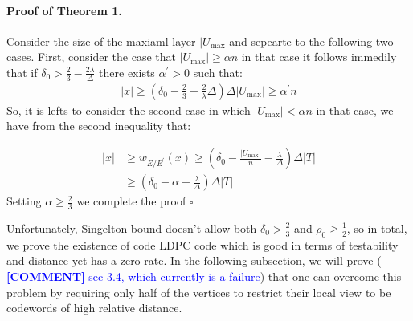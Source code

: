\documentclass{article}
\newcommand{\commentt}[1]{\textcolor{blue}{ \textbf{[COMMENT]} #1}}
\newcommand{\ctt}[1]{\commentt{#1}}
\begin{document}
\begin{multicols*}{2}
  \paragraph{Proof of Theorem 1.} Consider the size of the maxiaml layer $|U_{\max}$ and sepearte to the following two cases. First, consider the case that $|U_{\max}| \ge  \alpha n $ in that case it follows immedily that if $\delta_{0} > \frac{2}{3} - \frac{2\lambda}{\Delta}$ there exists $\alpha^{\prime} > 0 $ such that:  
  \begin{equation*}
    \begin{split}
      |x| \ge \left( \delta_{0} - \frac{2}{3} - \frac{2}{\lambda}\Delta \right)\Delta|U_{\max}| \ge  \alpha^{\prime} n 
    \end{split}
  \end{equation*}
  So, it is lefts to consider the second case in which $ |U_{\max}| < \alpha n $ in that case, we have from the second inequality that: 

  \begin{equation*}
    \begin{split}
      |x| & \ge  w_{E/E^{\prime}}\left( x \right)  \ge \left( \delta_{0} - \frac{|U_{\max}|}{n} - \frac{\lambda}{\Delta} \right) \Delta|T| \\ 
      & \ge \left( \delta_{0} - \alpha - \frac{\lambda}{\Delta} \right) \Delta|T| 
    \end{split}
  \end{equation*}
  Setting $\alpha \ge \frac{2}{3}$ we complete the proof $\square$

  Unfortunately, Singelton bound doesn't allow both $\delta_0 > \frac{2}{3}$ and $\rho_0 \ge \frac{1}{2}$, so in total, we prove the existence of code LDPC code which is good in terms of testability and distance yet has a zero rate. In the following subsection, we will prove (\ctt{sec 3.4, which currently is a failure}) that one can overcome this problem by requiring only half of the vertices to restrict their local view to be codewords of high relative distance. 



\end{multicols*}
\end{document}
